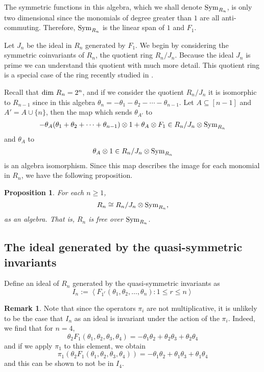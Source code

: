 \documentclass[11pt]{amsart}
\newtheorem{prop}[theorem]{Proposition}
\theoremstyle{definition}
\newtheorem{remark}[theorem]{Remark}
\numberwithin{equation}{section}
\begin{document}
The symmetric functions in this algebra, which we shall denote ${\rm Sym}_{R_n}$,
is only two dimensional since the monomials of degree greater than $1$
are all anti-commuting.  Therefore, ${\rm Sym}_{R_n}$ is the linear span of $1$ and $F_1$.

Let $J_n$ be the ideal in $R_n$ generated by $F_1$.
We begin by considering the symmetric
coinvariants of $R_n$, the quotient ring $R_n/J_n$.
Because the ideal $J_n$ is prime we can
understand this quotient with much more detail.
This quotient ring is a special case of the ring
recently studied in \cite{IRR,KR}.

Recall that ${\rm dim}~R_n = 2^n$,
and if we consider the quotient $R_n/J_n$ it is isomorphic to $R_{n-1}$ since
in this algebra $\theta_n = - \theta_1 -\theta_2 - \cdots - \theta_{n-1}$.
Let $A \subseteq [n-1]$ and $A' = A \cup \{n\}$, then
the map which sends
$\theta_{A'}$ to
$$-\theta_{A}(\theta_1 + \theta_2 + \cdots + \theta_{n-1}) \otimes 1
+ \theta_{A} \otimes F_1 \in R_n/J_n \otimes {\rm Sym}_{R_n}$$
and $\theta_{A}$ to
$$\theta_{A} \otimes 1 \in R_n/J_n \otimes {\rm Sym}_{R_n}$$
is an algebra isomorphism.  Since this map describes the image
for each monomial in $R_n$, we have the following proposition.

\begin{prop} \label{prop:free}
For each $n \geq 1$,
$$R_n \cong R_n/J_n \otimes {\rm Sym}_{R_n},$$
as an algebra.  That is, $R_n$ is free over ${\rm Sym}_{R_n}$.
\end{prop}

\subsection{The ideal generated by the quasi-symmetric invariants}

Define an ideal of $R_n$ generated by the quasi-symmetric invariants as
\[
I_n := \left< F_{1^r}(\theta_1, \theta_2, \ldots, \theta_n) : 1 \leq r \leq n \right>
\]

\begin{remark}
Note that since the operators $\pi_i$ are not multiplicative, it
is unlikely to be the case that $I_n$ as an ideal is invariant
under the action of the $\pi_i$.  Indeed, we find that for $n=4$,
\[
\theta_2 F_{1}(\theta_1, \theta_2, \theta_3, \theta_4) =
-\theta_1 \theta_2 + \theta_2 \theta_3 + \theta_2 \theta_4
\]
and if we apply $\pi_1$ to this element, we obtain
\[
\pi_1(\theta_2 F_{1}(\theta_1, \theta_2, \theta_3, \theta_4)) =
-\theta_1 \theta_2 + \theta_1 \theta_3 + \theta_1 \theta_4
\]
and this can be shown to not be in $I_4$.
\end{remark}
\end{document}
